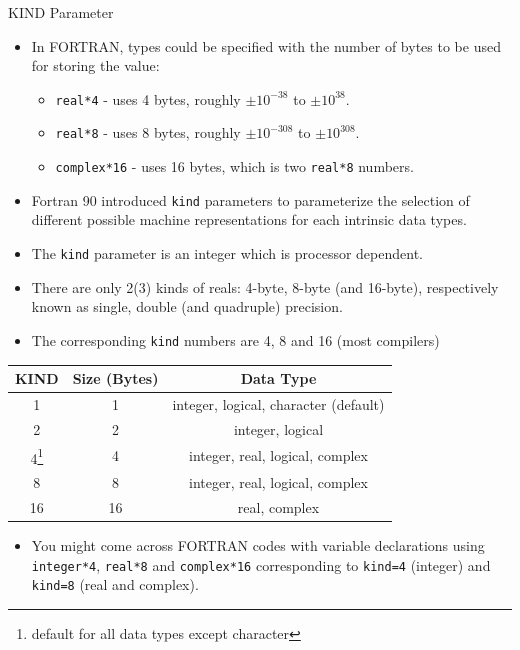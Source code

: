 \documentclass[c,mathserif,compress,xcolor=svgnames]{beamer}
\newcommand{\lstfortran}[1]{\lstinline[language={[90]Fortran},basicstyle=\footnotesize\ttfamily]|#1|}
\begin{document}
\begin{frame}{KIND Parameter}
  \begin{itemize}
    \item In FORTRAN, types could be specified with the number of bytes to be used for storing the value:
      \begin{itemize}
        \item \lstfortran{real*4} - uses 4 bytes, roughly $\pm10^{-38}$ to $\pm10^{38}$.
        \item \lstfortran{real*8} - uses 8 bytes, roughly $\pm10^{-308}$ to $\pm10^{308}$.
        \item \lstfortran{complex*16} - uses 16 bytes, which is two \lstfortran{real*8} numbers.
      \end{itemize}
    \item Fortran 90 introduced \lstfortran{kind} parameters to parameterize the selection of different possible machine representations for each intrinsic data types.
    \item The \lstfortran{kind} parameter is an integer which is processor dependent.
    \item There are only 2(3) kinds of reals: 4-byte, 8-byte (and 16-byte), respectively known as single, double (and quadruple) precision.
    \item The corresponding \lstfortran{kind} numbers are 4, 8 and 16 (most compilers)
  \end{itemize}
  \begin{minipage}{\textwidth}
    \begin{center}
      \begin{tabular}{|c|c|c|}
        \hline
        KIND & Size (Bytes) & Data Type \\
        \hline
        1 & 1 & integer, logical, character (default) \\
        2 & 2 & integer, logical \\
        4\footnote{\tiny default for all data types except character} & 4 & integer, real, logical, complex \\
        8 & 8 & integer, real, logical, complex \\
        16 & 16 & real, complex \\
        \hline
      \end{tabular}
    \end{center}
  \end{minipage}
  \begin{itemize}
    \item You might come across FORTRAN codes with variable declarations using \lstfortran{integer*4}, \lstfortran{real*8} and \lstfortran{complex*16} corresponding to \lstfortran{kind=4} (integer) and \lstfortran{kind=8} (real and complex).

\end{itemize}
\end{frame}
\end{document}
